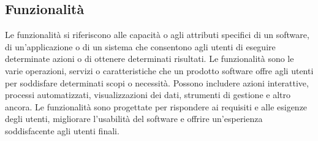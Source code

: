 \subsection{Funzionalità} 
Le funzionalità si riferiscono alle capacità o agli attributi specifici di un software, di un'applicazione o di un sistema che consentono agli utenti di eseguire determinate azioni o di ottenere determinati risultati. Le funzionalità sono le varie operazioni, servizi o caratteristiche che un prodotto software offre agli utenti per soddisfare determinati scopi o necessità. Possono includere azioni interattive, processi automatizzati, visualizzazioni dei dati, strumenti di gestione e altro ancora. Le funzionalità sono progettate per rispondere ai requisiti e alle esigenze degli utenti, migliorare l'usabilità del software e offrire un'esperienza soddisfacente agli utenti finali.

